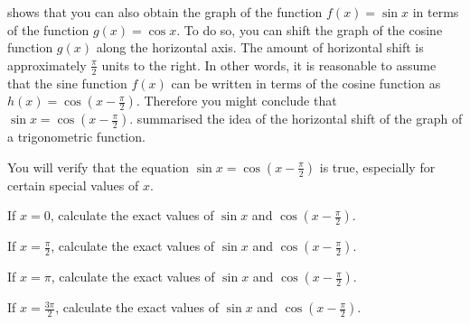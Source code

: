 \documentclass[a4paper,oneside,12pt]{article}
\begin{document}

 shows that you can
also obtain the graph of the function $f(x) = \sin x$ in terms of the
function $g(x) = \cos x$.  To do so, you can shift the graph of the
cosine function $g(x)$ along the horizontal axis.  The amount of
horizontal shift is approximately $\frac{\pi}{2}$ units to the right.
In other words, it is reasonable to assume that the sine function
$f(x)$ can be written in terms of the cosine function as
$h(x) = \cos(x - \frac{\pi}{2})$.  Therefore you might conclude that
$\sin x = \cos(x - \frac{\pi}{2})$.
 summarised the idea of
the horizontal shift of the graph of a trigonometric function.

\begin{exercise}
You will verify that the equation $\sin x = \cos(x - \frac{\pi}{2})$
is true, especially for certain special values of $x$.
\begin{packedenum}
\item\label{subex:trigonometric:cos_right_shift_0}
  If $x = 0$, calculate the exact values of $\sin x$ and
  $\cos(x - \frac{\pi}{2})$.

\item\label{subex:trigonometric:cos_right_shift_pi_half}
  If $x = \frac{\pi}{2}$, calculate the exact values of $\sin x$ and
  $\cos(x - \frac{\pi}{2})$.

\item\label{subex:trigonometric:cos_right_shift_pi}
  If $x = \pi$, calculate the exact values of $\sin x$ and
  $\cos(x - \frac{\pi}{2})$.

\item\label{subex:trigonometric:cos_right_shift_3pi_half}
  If $x = \frac{3\pi}{2}$, calculate the exact values of $\sin x$ and
  $\cos(x - \frac{\pi}{2})$.
\end{packedenum}
\end{exercise}
\end{document}
